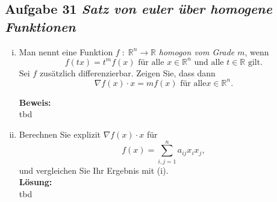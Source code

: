 \subsection*{Aufgabe 31 \mdseries\itshape Satz von euler über homogene Funktionen}

\begin{enumerate}[(i)]
   \item Man nennt eine Funktion $f \; : \; \mathbb{R}^n \rightarrow \mathbb{R}$ \emph{homogon vom Grade $m$},
      wenn
      $$
         f(tx)=t^m f(x) \text{ für alle }x\in\mathbb{R}^n\text{ und alle }t\in\mathbb{R}\text{ gilt.}
      $$
      Sei $f$ zusätzlich differenzierbar. Zeigen Sie, dass dann
      $$
         \nabla f(x) \cdot x = m f(x) \text{ für alle}x\in\mathbb{R}^n. 
      $$

   \textbf{Beweis:}\\
      tbd

   \item Berechnen Sie explizit $\nabla f(x) \cdot x$ für
      $$
         f(x) = \underset{i,j=1}{\overset{n}{\sum}} a_{ij}x_ix_j,
      $$
      und vergleichen Sie Ihr Ergebnis mit (i).\\

   \textbf{Lösung:}\\
      tbd
\end{enumerate}

